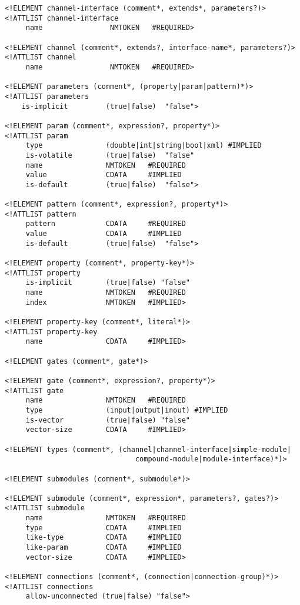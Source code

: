 \begin{verbatim}
<!ELEMENT channel-interface (comment*, extends*, parameters?)>
<!ATTLIST channel-interface
     name                NMTOKEN   #REQUIRED>

<!ELEMENT channel (comment*, extends?, interface-name*, parameters?)>
<!ATTLIST channel
     name                NMTOKEN   #REQUIRED>

<!ELEMENT parameters (comment*, (property|param|pattern)*)>
<!ATTLIST parameters
    is-implicit         (true|false)  "false">

<!ELEMENT param (comment*, expression?, property*)>
<!ATTLIST param
     type               (double|int|string|bool|xml) #IMPLIED
     is-volatile        (true|false)  "false"
     name               NMTOKEN   #REQUIRED
     value              CDATA     #IMPLIED
     is-default         (true|false)  "false">

<!ELEMENT pattern (comment*, expression?, property*)>
<!ATTLIST pattern
     pattern            CDATA     #REQUIRED
     value              CDATA     #IMPLIED
     is-default         (true|false)  "false">

<!ELEMENT property (comment*, property-key*)>
<!ATTLIST property
     is-implicit        (true|false) "false"
     name               NMTOKEN   #REQUIRED
     index              NMTOKEN   #IMPLIED>

<!ELEMENT property-key (comment*, literal*)>
<!ATTLIST property-key
     name               CDATA     #IMPLIED>

<!ELEMENT gates (comment*, gate*)>

<!ELEMENT gate (comment*, expression?, property*)>
<!ATTLIST gate
     name               NMTOKEN   #REQUIRED
     type               (input|output|inout) #IMPLIED
     is-vector          (true|false) "false"
     vector-size        CDATA     #IMPLIED>

<!ELEMENT types (comment*, (channel|channel-interface|simple-module|
                               compound-module|module-interface)*)>

<!ELEMENT submodules (comment*, submodule*)>

<!ELEMENT submodule (comment*, expression*, parameters?, gates?)>
<!ATTLIST submodule
     name               NMTOKEN   #REQUIRED
     type               CDATA     #IMPLIED
     like-type          CDATA     #IMPLIED
     like-param         CDATA     #IMPLIED
     vector-size        CDATA     #IMPLIED>

<!ELEMENT connections (comment*, (connection|connection-group)*)>
<!ATTLIST connections
     allow-unconnected (true|false) "false">


\end{verbatim}
